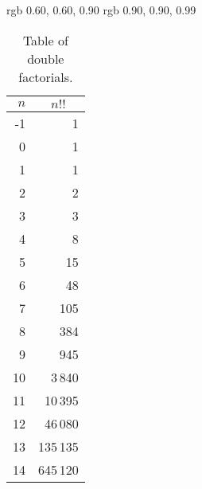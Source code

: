 \begin{table}[t]
    \definecolor {HeadingColor} {rgb} {0.60, 0.60, 0.90}
    \definecolor {ShadingColor} {rgb} {0.90, 0.90, 0.99}
    \newcommand{\R}{\rowcolor{ShadingColor}}
    \begin{center}
        \caption{Table of double factorials.}
        \label{dfact}
        \medskip
        \begin{tabular}{rr}
            \hline
            \rowcolor{HeadingColor}
            \boldmath $n$ & \multicolumn{1}{c}{\boldmath $n!!$} \\
            \hline
                  -1 &                                   1 \\
                   0 &                                   1 \\
            \R     1 &                                   1 \\
            \R     2 &                                   2 \\
            \R     3 &                                   3 \\
            \R     4 &                                   8 \\
            \R     5 &                                  15 \\
                   6 &                                  48 \\
                   7 &                                 105 \\
                   8 &                                 384 \\
                   9 &                                 945 \\
                  10 &                               3\,840 \\
            \R    11 &                              10\,395 \\
            \R    12 &                              46\,080 \\
            \R    13 &                             135\,135 \\
            \R    14 &                             645\,120 \\

\end{tabular}
\end{center}
\end{table}
